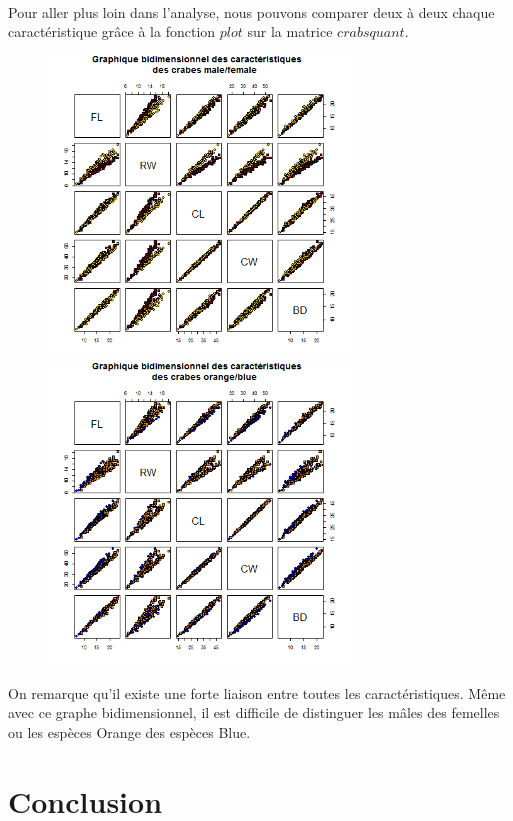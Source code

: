\documentclass[titlepage]{article}
\begin{document}
\paragraph{}
Pour aller plus loin dans l'analyse, nous pouvons comparer deux à deux chaque caractéristique grâce à la fonction $plot$ sur la matrice $crabsquant$.
\begin{figure}[H]
\begin{center}
\includegraphics[width=8cm]{sexe-crabs.png}
\includegraphics[width=8cm]{spicies-crabs.png}
\end{center}
\end{figure}
On remarque qu'il existe une forte liaison entre toutes les caractéristiques. Même avec ce graphe bidimensionnel, il est difficile de distinguer les mâles des femelles ou les espèces Orange des espèces Blue.
\subsubsection{}

\section{Conclusion}
\end{document}
